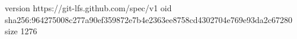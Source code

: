 version https://git-lfs.github.com/spec/v1
oid sha256:964275008c277a90ef359872e7b4e2363ee8758cd4302704e769e93da2c67280
size 1276
